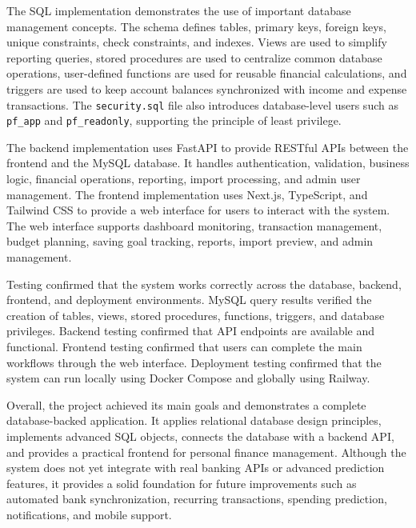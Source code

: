 ﻿\documentclass{article}
\begin{document}
The SQL implementation demonstrates the use of important database management concepts. The schema defines tables, primary keys, foreign keys, unique constraints, check constraints, and indexes. Views are used to simplify reporting queries, stored procedures are used to centralize common database operations, user-defined functions are used for reusable financial calculations, and triggers are used to keep account balances synchronized with income and expense transactions. The \texttt{security.sql} file also introduces database-level users such as \texttt{pf\_app} and \texttt{pf\_readonly}, supporting the principle of least privilege.

The backend implementation uses FastAPI to provide RESTful APIs between the frontend and the MySQL database. It handles authentication, validation, business logic, financial operations, reporting, import processing, and admin user management. The frontend implementation uses Next.js, TypeScript, and Tailwind CSS to provide a web interface for users to interact with the system. The web interface supports dashboard monitoring, transaction management, budget planning, saving goal tracking, reports, import preview, and admin management.

Testing confirmed that the system works correctly across the database, backend, frontend, and deployment environments. MySQL query results verified the creation of tables, views, stored procedures, functions, triggers, and database privileges. Backend testing confirmed that API endpoints are available and functional. Frontend testing confirmed that users can complete the main workflows through the web interface. Deployment testing confirmed that the system can run locally using Docker Compose and globally using Railway.

Overall, the project achieved its main goals and demonstrates a complete database-backed application. It applies relational database design principles, implements advanced SQL objects, connects the database with a backend API, and provides a practical frontend for personal finance management. Although the system does not yet integrate with real banking APIs or advanced prediction features, it provides a solid foundation for future improvements such as automated bank synchronization, recurring transactions, spending prediction, notifications, and mobile support.

\newpage
\end{document}
